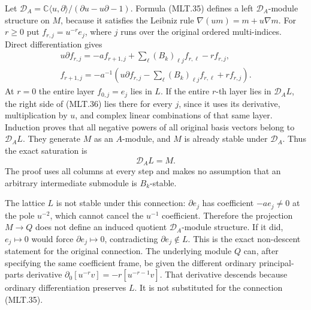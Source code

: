 Let \(\mathcal D_A=\mathbb C\langle u,\partial\rangle/
(\partial u-u\partial-1)\). Formula (MLT.35)
defines a left \(\mathcal D_A\)-module
structure on \(M\), because it satisfies
the Leibniz rule
\(\nabla(um)=m+u\nabla m\).
For \(r\ge0\) put \(f_{r,j}=u^{-r}e_j\),
where \(j\) runs over the original ordered
multi-indices. Direct differentiation gives
\[
 \begin{gathered}
 u\partial f_{r,j}
     =-a f_{r+1,j}
       +\sum_\ell(B_k)_{\ell j}f_{r,\ell}
       -r f_{r,j},\\
 f_{r+1,j}=-a^{-1}
       \left(u\partial f_{r,j}
        -\sum_\ell(B_k)_{\ell j}f_{r,\ell}
        +r f_{r,j}\right).
 \end{gathered}                                             \tag{MLT.36}
\]
At \(r=0\) the entire layer \(f_{0,j}=e_j\)
lies in \(L\). If the entire \(r\)-th
layer lies in \(\mathcal D_A L\), the
right side of (MLT.36) lies there for
every \(j\), since it uses its derivative,
multiplication by \(u\), and complex
linear combinations of that same layer.
Induction proves that all negative
powers of all original basis vectors
belong to \(\mathcal D_A L\). They
generate \(M\) as an \(A\)-module,
and \(M\) is already stable under
\(\mathcal D_A\). Thus the exact
saturation is
\[
                         \mathcal D_A L=M.               \tag{MLT.37}
\]
The proof uses all columns at every
step and makes no assumption that
an arbitrary intermediate submodule
is \(B_k\)-stable.

The lattice \(L\) is not stable under
this connection: \(\partial e_j\)
has coefficient \(-a e_j\ne0\) at
the pole \(u^{-2}\), which cannot
cancel the \(u^{-1}\) coefficient.
Therefore the projection \(M\to Q\)
does not define an induced quotient
\(\mathcal D_A\)-module structure.
If it did, \(e_j\mapsto0\) would
force \(\partial e_j\mapsto0\),
contradicting \(\partial e_j\notin L\).
This is the exact non-descent
statement for the original connection.
The underlying module \(Q\) can,
after specifying the same coefficient
frame, be given the different
ordinary principal-parts derivative
\(\partial_0[u^{-r}v]=-r[u^{-r-1}v]\).
That derivative descends because
ordinary differentiation preserves
\(L\). It is not substituted for
the connection (MLT.35).

